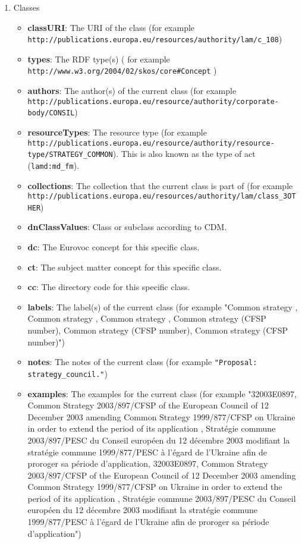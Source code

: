 \begin{enumerate}
\begin{itemize}
	\end{itemize}
	\item Classes
	\begin{itemize}
	\item \textbf{classURI}: The URI of the class (for example \lstinline!http://publications.europa.eu/resources/authority/lam/c_108!)
	\item \textbf{types}: The RDF type(s) ( for example \lstinline!http://www.w3.org/2004/02/skos/core#Concept! )
	\item \textbf{authors}: The author(s) of the current class (for example \lstinline!http://publications.europa.eu/resource/authority/corporate-body/CONSIL!)
	\item \textbf{resourceTypes}: The resource type (for example \lstinline!http://publications.europa.eu/resource/authority/resource-type/STRATEGY_COMMON!). This is also known as the type of act (\lstinline!lamd:md_fm!).
	\item \textbf{collections}: The collection that the current class is part of (for example \lstinline!http://publications.europa.eu/resources/authority/lam/class_3OTHER!)
	\item \textbf{dnClassValues}: Class or subclass according to CDM.
	\item \textbf{dc}: The Eurovoc concept for this specific class.
	\item \textbf{ct}: The subject matter concept for this specific class.
	\item \textbf{cc}: The directory code for this specific class.
	\item \textbf{labels}: The label(s) of the current class (for example "Common strategy , Common strategy , Common strategy , Common strategy (CFSP number), Common strategy (CFSP number), Common strategy (CFSP number)")
	\item \textbf{notes}: The notes of the current class (for example \lstinline!"Proposal: strategy_council."!)
	\item \textbf{examples}: The examples for the current class (for example "32003E0897, Common Strategy 2003/897/CFSP of the European Council of 12 December 2003 amending Common Strategy 1999/877/CFSP on Ukraine in order to extend the period of its application , Stratégie commune 2003/897/PESC du Conseil européen du 12 décembre 2003 modifiant la stratégie commune 1999/877/PESC à l'égard de l'Ukraine afin de proroger sa période d'application, 32003E0897, Common Strategy 2003/897/CFSP of the European Council of 12 December 2003 amending Common Strategy 1999/877/CFSP on Ukraine in order to extend the period of its application , Stratégie commune 2003/897/PESC du Conseil européen du 12 décembre 2003 modifiant la stratégie commune 1999/877/PESC à l'égard de l'Ukraine afin de proroger sa période d'application")

\end{itemize}
\end{enumerate}
